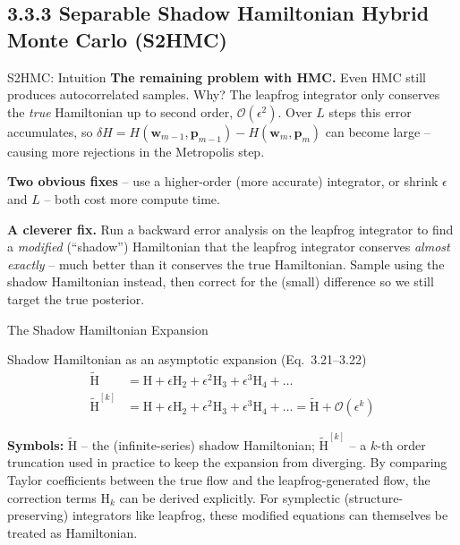 \documentclass[aspectratio=169,10pt]{beamer}
\newcommand{\bw}{\mathbf{w}}
\newcommand{\bp}{\mathbf{p}}
\newcommand{\Ham}{\mathrm{H}}
\begin{document}
\subsection{3.3.3 Separable Shadow Hamiltonian Hybrid Monte Carlo (S2HMC)}

\begin{frame}{S2HMC: Intuition}
  \textbf{The remaining problem with HMC.} Even HMC still produces
  autocorrelated samples. Why? The leapfrog integrator only conserves the
  \emph{true} Hamiltonian up to second order, $\mathcal{O}(\epsilon^2)$. Over
  $L$ steps this error accumulates, so $\delta H = H(\bw_{m-1},\bp_{m-1}) -
  H(\bw_m,\bp_m)$ can become large -- causing more rejections in the
  Metropolis step.

  \vspace{2mm}
  \textbf{Two obvious fixes} -- use a higher-order (more accurate)
  integrator, or shrink $\epsilon$ and $L$ -- both cost more compute time.

  \vspace{2mm}
  \textbf{A cleverer fix.} Run a backward error analysis on the leapfrog
  integrator to find a \emph{modified} (``shadow'') Hamiltonian that the
  leapfrog integrator conserves \emph{almost exactly} -- much better than it
  conserves the true Hamiltonian. Sample using the shadow Hamiltonian
  instead, then correct for the (small) difference so we still target the
  true posterior.
\end{frame}

\begin{frame}{The Shadow Hamiltonian Expansion}
  \begin{block}{Shadow Hamiltonian as an asymptotic expansion (Eq.~3.21--3.22)}
  \begin{align}
    \tilde{\Ham} &= \Ham + \epsilon \Ham_2 + \epsilon^2 \Ham_3 + \epsilon^3 \Ham_4 + \ldots \\
    \tilde{\Ham}^{[k]} &= \Ham + \epsilon \Ham_2 + \epsilon^2 \Ham_3 + \epsilon^3 \Ham_4 + \ldots = \tilde{\Ham} + \mathcal{O}(\epsilon^k)
  \end{align}
  \end{block}
  \textbf{Symbols:} $\tilde{\Ham}$ -- the (infinite-series) shadow
  Hamiltonian; $\tilde{\Ham}^{[k]}$ -- a $k$-th order truncation used in
  practice to keep the expansion from diverging. By comparing Taylor
  coefficients between the true flow and the leapfrog-generated flow, the
  correction terms $\Ham_k$ can be derived explicitly. For symplectic
  (structure-preserving) integrators like leapfrog, these modified equations
  can themselves be treated as Hamiltonian.
\end{frame}
\end{document}
